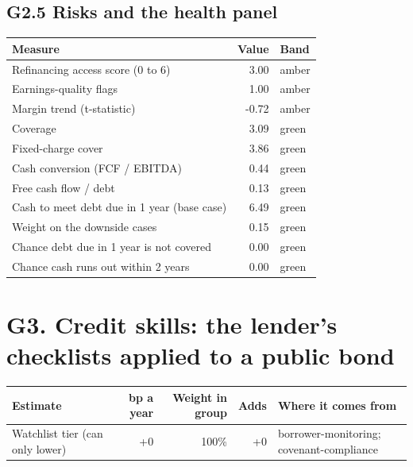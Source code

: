\documentclass[11pt,a4paper]{article}
\begin{document}
\subsection*{G2.5 Risks and the health panel}
\begin{center}\footnotesize\setlength{\tabcolsep}{3.5pt}\begin{tabular}{@{}lrl@{}}\toprule
Measure & Value & Band \\\midrule
Refinancing access score (0 to 6) & 3.00 & \textcolor{amber}{amber} \\
Earnings-quality flags & 1.00 & \textcolor{amber}{amber} \\
Margin trend (t-statistic) & -0.72 & \textcolor{amber}{amber} \\
Coverage & 3.09 & \textcolor{good}{green} \\
Fixed-charge cover & 3.86 & \textcolor{good}{green} \\
Cash conversion (FCF / EBITDA) & 0.44 & \textcolor{good}{green} \\
Free cash flow / debt & 0.13 & \textcolor{good}{green} \\
Cash to meet debt due in 1 year (base case) & 6.49 & \textcolor{good}{green} \\
Weight on the downside cases & 0.15 & \textcolor{good}{green} \\
Chance debt due in 1 year is not covered & 0.00 & \textcolor{good}{green} \\
Chance cash runs out within 2 years & 0.00 & \textcolor{good}{green} \\
\bottomrule\end{tabular}\end{center}
\section*{G3. Credit skills: the lender's checklists applied to a public bond}
\par\noindent{}
\begin{center}\footnotesize\setlength{\tabcolsep}{3.5pt}\begin{tabular}{@{}p{6.2cm}rrrp{4.2cm}@{}}\toprule
Estimate & bp a year & Weight in group & Adds & Where it comes from \\\midrule
Watchlist tier (can only lower) & +0 & 100\% & +0 & borrower-monitoring; covenant-compliance \\
\bottomrule\end{tabular}\end{center}
\end{document}
